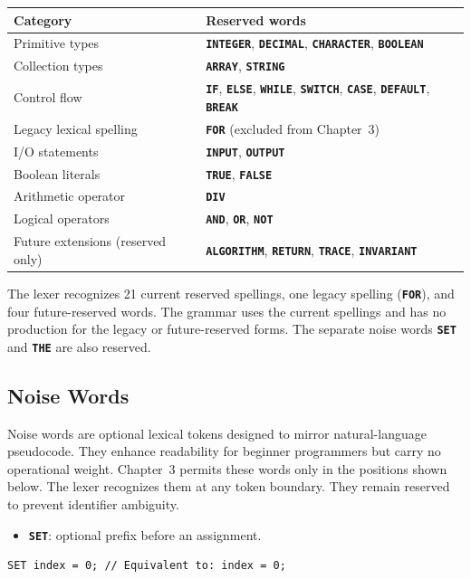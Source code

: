 \documentclass[11pt,a4paper]{article}
\newcommand{\kw}[1]{\texttt{\bfseries\color{pupmaroon}#1}}
\begin{document}
\begin{center}
\begin{tabularx}{\linewidth}{L{47mm} Y}
\toprule
\textbf{Category} & \textbf{Reserved words} \\
\midrule
Primitive types & \kw{INTEGER}, \kw{DECIMAL}, \kw{CHARACTER}, \kw{BOOLEAN} \\
Collection types & \kw{ARRAY}, \kw{STRING} \\
Control flow & \kw{IF}, \kw{ELSE}, \kw{WHILE}, \kw{SWITCH}, \kw{CASE}, \kw{DEFAULT}, \kw{BREAK} \\
Legacy lexical spelling & \kw{FOR} (excluded from Chapter~3) \\
I/O statements & \kw{INPUT}, \kw{OUTPUT} \\
Boolean literals & \kw{TRUE}, \kw{FALSE} \\
Arithmetic operator & \kw{DIV} \\
Logical operators & \kw{AND}, \kw{OR}, \kw{NOT} \\
Future extensions (reserved only) & \kw{ALGORITHM}, \kw{RETURN}, \kw{TRACE}, \kw{INVARIANT} \\
\bottomrule
\end{tabularx}
\end{center}

The lexer recognizes 21 current reserved spellings, one legacy spelling (\kw{FOR}), and four future-reserved words. The grammar uses the current spellings and has no production for the legacy or future-reserved forms. The separate noise words \kw{SET} and \kw{THE} are also reserved.

\subsection{Noise Words}

Noise words are optional lexical tokens designed to mirror natural-language pseudocode. They enhance readability for beginner programmers but carry no operational weight. Chapter~3 permits these words only in the positions shown below. The lexer recognizes them at any token boundary. They remain reserved to prevent identifier ambiguity.

\begin{itemize}
  \item \kw{SET}: optional prefix before an assignment.
\end{itemize}
\begin{lstlisting}
SET index = 0; // Equivalent to: index = 0;
\end{lstlisting}
\end{document}
